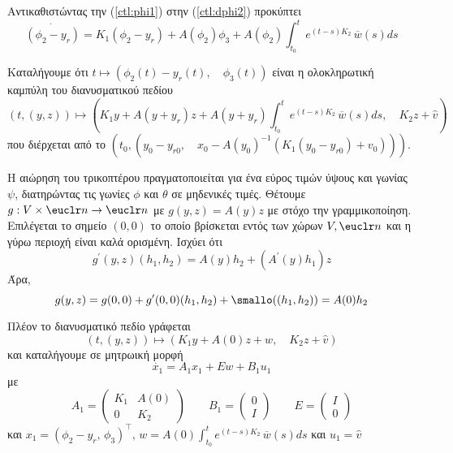 Αντικαθιστώντας την (\ref{ctl:phi1}) στην (\ref{ctl:dphi2}) προκύπτει
\begin{equation}
    \dot{(\phi_2 - y_r)} = K_1 (\phi_2 - y_r) + A(\phi_2) \phi_3 + 
    A(\phi_2)\int_{t_0}^{t}{e^{(t-s)K_2}\,\overline{w}(s)} ds    
\end{equation}

Καταλήγουμε ότι $t \mapsto (\phi_2(t) - y_r(t),\quad \phi_3(t))$ είναι η 
ολοκληρωτική καμπύλη του διανυσματικού πεδίου
\begin{equation*}
    \left(t, (y,z)\right) \mapsto \left(K_1y + A(y + y_r)z + A(y + y_r)
    \int_{t_0}^{t}{e^{(t-s)K_2}\,\overline{w}(s)} ds,\quad K_2z + 
    \widehat{v}\right)
\end{equation*}
που διέρχεται από το $\left(t_0,\left(y_0 - y_{r0},\quad x_0 - A(y_0)^{-1}\left(
K_1(y_0 - y_{r0}) + v_0\right)\right)\right)$.

Η αιώρηση του τρικοπτέρου πραγματοποιείται για ένα εύρος τιμών ύψους και γωνίας 
$\psi$, διατηρώντας τις γωνίες $\phi$ και $\theta$ σε μηδενικές τιμές. Θέτουμε 
$g:V \times \euclr n \rightarrow \euclr n$ με $g(y, z) = A(y)z$ με στόχο την 
γραμμικοποίηση. Επιλέγεται το σημείο $(0, 0)$ το οποίο βρίσκεται εντός των χώρων
$V, \euclr n$ και η γύρω περιοχή είναι καλά ορισμένη. Ισχύει ότι
\begin{equation*}
    g^{\prime}(y, z)(h_1, h_2) = A(y) h_2 + (A^{\prime}(y)h_1)z
\end{equation*}
Άρα,
\begin{equation*}
    g(y, z) = g(0, 0) + g^{\prime}(0, 0)(h_1, h_2) + \smallo((h_1, h_2)) = 
    A(0)h_2
\end{equation*}

Πλέον το διανυσματικό πεδίο γράφεται
\begin{equation*}
    \left(t, (y,z)\right) \mapsto \left(K_1y + A(0)z + w,\quad K_2z + 
    \widehat{v}\right)
\end{equation*}
και καταλήγουμε σε μητρωική μορφή
\begin{equation}
    \dot{x_1} = A_1 x_1 + Ew + B_1 u_1
    \label{ctl:linsys}
\end{equation}
με 
\begin{equation*}
    A_1 =
    \begin{pmatrix}
        K_1 & A(0) \\
        0 & K_2
    \end{pmatrix} \qquad
    B_1 = 
    \begin{pmatrix}
        0 \\
        I
    \end{pmatrix} \qquad
    E = 
    \begin{pmatrix}
        I \\
        0
    \end{pmatrix}
\end{equation*}
και $x_1 = \left(\phi_2 - y_r, \, \phi_3\right)^{\intercal}, \, w = 
A(0)\int_{t_0}^{t}{e^{(t-s)K_2}\,\overline{w}(s)} ds$ και $u_1 = \widehat{v}$

